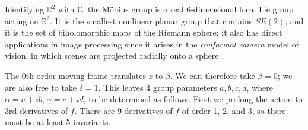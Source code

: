 \documentclass[review,onefignum,onetabnum]{siamonline190516}
\def\R{\mathbb{R}}
\begin{document}
Identifying $\R^2$ with $\mathbb{C}$, the M\"obius group is a real 6-dimensional local Lie group acting on $\mathbb{R}^2$.
It is the smallest nonlinear planar group that contains $SE(2)$, and it is the set of biholomorphic maps of the Riemann sphere; it also has direct applications in image processing since it arises in the {\em conformal camera} model of vision, in which scenes are projected radially onto a sphere \cite{lenz1990group,turski2004geometric}. 

The 0th order moving frame translates $z$ to $\beta$. We can therefore take $\beta=0$; we are also free to take $\delta=1$. This leaves 4 group parameters $a,b,c,d$, where $\alpha = a + i b$, $\gamma = c + i d$, to be determined as follows. First we prolong the action to 3rd derivatives of $f$. There are 9 derivatives of $f$ of order 1, 2, and 3, so there must be at least 5 invariants.
\end{document}
